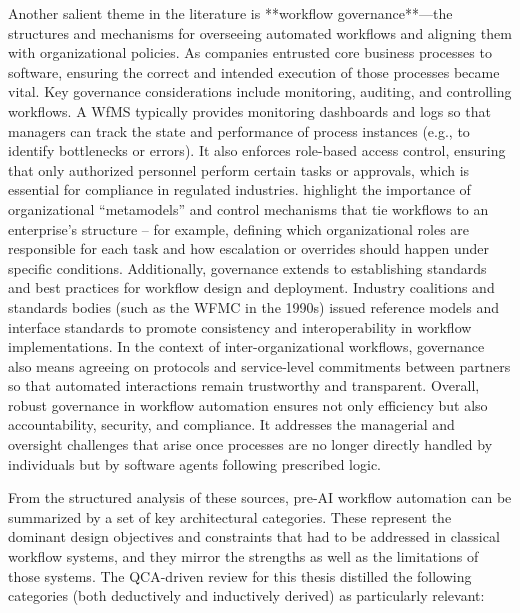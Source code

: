 Another salient theme in the literature is **workflow governance**---the structures and mechanisms for overseeing automated workflows and aligning them with organizational policies. As companies entrusted core business processes to software, ensuring the correct and intended execution of those processes became vital. Key governance considerations include monitoring, auditing, and controlling workflows. A WfMS typically provides monitoring dashboards and logs so that managers can track the state and performance of process instances (e.g., to identify bottlenecks or errors). It also enforces role-based access control, ensuring that only authorized personnel perform certain tasks or approvals, which is essential for compliance in regulated industries.\textcite{basuResearch2002} highlight the importance of organizational “metamodels” and control mechanisms that tie workflows to an enterprise’s structure – for example, defining which organizational roles are responsible for each task and how escalation or overrides should happen under specific conditions. Additionally, governance extends to establishing standards and best practices for workflow design and deployment. Industry coalitions and standards bodies (such as the WFMC in the 1990s) issued reference models and interface standards to promote consistency and interoperability in workflow implementations. In the context of inter-organizational workflows, governance also means agreeing on protocols and service-level commitments between partners so that automated interactions remain trustworthy and transparent. Overall, robust governance in workflow automation ensures not only efficiency but also accountability, security, and compliance. It addresses the managerial and oversight challenges that arise once processes are no longer directly handled by individuals but by software agents following prescribed logic.

From the structured analysis of these sources, pre-AI workflow automation can be summarized by a set of key architectural categories. These represent the dominant design objectives and constraints that had to be addressed in classical workflow systems, and they mirror the strengths as well as the limitations of those systems. The QCA-driven review for this thesis distilled the following categories (both deductively and inductively derived) as particularly relevant:

